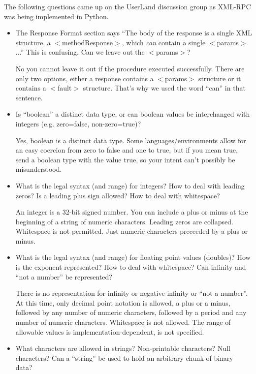 The following questions came up on the UserLand discussion group as XML-RPC was being implemented in Python.
\begin{itemize}
\item The Response Format section says ``The body of the response is a single XML structure, a $<$methodResponse$>$, which \emph{ can}
contain a single $<$params$>$...'' This is confusing. Can we leave out the $<$params$>$? 

No you cannot leave it out if the procedure executed successfully. There are only two options, either a response contains a $<$params$>$ structure or it contains a $<$fault$>$ structure. That's why we used the word ``can'' in that sentence.

\item Is ``boolean'' a distinct data type, or can boolean values be interchanged with integers (e.g. zero=false, non-zero=true)? 

Yes, boolean is a distinct data type. Some languages/environments allow for an easy coercion from zero to false and one to true, but if you mean true, send a boolean type with the value true, so your intent can't possibly be misunderstood.

\item What is the legal syntax (and range) for integers? How to deal with leading zeros? Is a leading plus sign allowed? How to deal with whitespace? 

An integer is a 32-bit signed number. You can include a plus or minus at the beginning of a string of numeric characters. Leading zeros are collapsed. Whitespace is not permitted. Just numeric characters preceeded by a plus or minus.

\item What is the legal syntax (and range) for floating point values (doubles)? How is the exponent represented? How to deal with whitespace? Can infinity and ``not a number'' be represented? 

There is no representation for infinity or negative infinity or ``not a number''. At this time, only decimal point notation is allowed, a plus or a minus, followed by any number of numeric characters, followed by a period and any number of numeric characters. Whitespace is not allowed. The range of allowable values is implementation-dependent, is not specified.

\item What characters are allowed in strings? Non-printable characters? Null characters? Can a ``string'' be used to hold an arbitrary chunk of binary data? 


\end{itemize}
